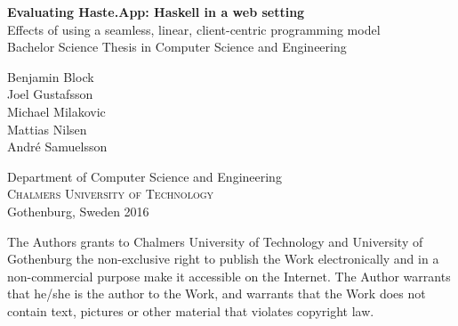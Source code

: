 \documentclass[a4paper]{article}
\begin{document}

\begin{titlepage}





\mbox{}
\vfill
\renewcommand{\familydefault}{\sfdefault} \normalfont %
\textbf{{\huge Evaluating Haste.App: Haskell in a web setting}}   \\[0.5cm]
{\Large Effects of using a seamless, linear, client-centric programming model}\\[0.5cm]

Bachelor Science Thesis in Computer Science and Engineering \setlength{\parskip}{1cm}



{\Large Benjamin Block} \setlength{\parskip}{2.9cm}\\
{\Large Joel Gustafsson} \setlength{\parskip}{2.9cm}\\
{\Large Michael Milakovic} \setlength{\parskip}{2.9cm}\\
{\Large Mattias Nilsen} \setlength{\parskip}{2.9cm}\\
{\Large André Samuelsson} \setlength{\parskip}{2.9cm}


Department of Computer Science and Engineering \\
\textsc{Chalmers University of Technology} \\
Gothenburg, Sweden 2016

\renewcommand{\familydefault}{\rmdefault} \normalfont %
\end{titlepage}

\newpage
\thispagestyle{plain}
The Authors grants to Chalmers University of Technology and University of Gothenburg the non-exclusive right to publish the Work electronically and in a non-commercial purpose make it accessible on the Internet. The Author warrants that he/she is the author to the Work, and warrants that the Work does not contain text, pictures or other material that violates copyright law.
\end{document}
